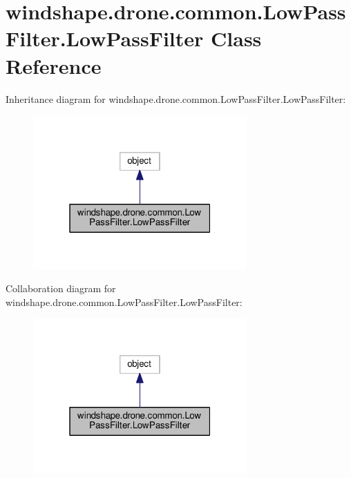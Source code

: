 \hypertarget{classwindshape_1_1drone_1_1common_1_1_low_pass_filter_1_1_low_pass_filter}{}\section{windshape.\+drone.\+common.\+Low\+Pass\+Filter.\+Low\+Pass\+Filter Class Reference}
\label{classwindshape_1_1drone_1_1common_1_1_low_pass_filter_1_1_low_pass_filter}


Inheritance diagram for windshape.\+drone.\+common.\+Low\+Pass\+Filter.\+Low\+Pass\+Filter\+:\nopagebreak
\begin{figure}[H]
\begin{center}
\leavevmode
\includegraphics[width=232pt]{classwindshape_1_1drone_1_1common_1_1_low_pass_filter_1_1_low_pass_filter__inherit__graph}
\end{center}
\end{figure}


Collaboration diagram for windshape.\+drone.\+common.\+Low\+Pass\+Filter.\+Low\+Pass\+Filter\+:\nopagebreak
\begin{figure}[H]
\begin{center}
\leavevmode
\includegraphics[width=232pt]{classwindshape_1_1drone_1_1common_1_1_low_pass_filter_1_1_low_pass_filter__coll__graph}
\end{center}
\end{figure}
